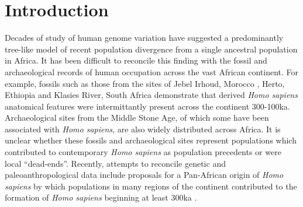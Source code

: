 \documentclass[]{article}
\begin{document}
\section*{Introduction}


Decades of study of human genome variation have suggested a predominantly
tree-like model of recent population divergence from a single ancestral
population in Africa. It has been difficult to reconcile this finding with the
fossil and archaeological records of human occupation across the vast African
continent. For example, fossils such as those from the sites of Jebel Irhoud,
Morocco \citep{Hublin2017-cq}, Herto, Ethiopia \citep{White2003-bk} and Klasies
River, South Africa \citep{Deacon1995-rx} demonstrate that derived \emph{Homo
sapiens} anatomical features were intermittantly present across the continent
300-100ka. Archaeological sites from the Middle Stone Age, of which some have
been associated with \emph{Homo sapiens}, are also widely distributed across
Africa. It is unclear whether these fossils and archaeological sites represent
populations which contributed to contemporary \emph{Homo sapiens} as population
precedents or were local ``dead-ends''. Recently, attempts to reconcile genetic
and paleoanthropological data include proposals for a Pan-African origin of
\emph{Homo sapiens} by which populations in many regions of the continent
contributed to the formation of \emph{Homo sapiens} beginning at least 300ka
\citep{Stringer2016-mj,Scerri2018-nl,Scerri2019-xg}.
\end{document}
